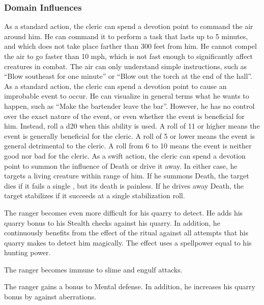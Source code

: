 \subsubsection{Domain Influences}\label{Domain Influences}
As a standard action, the cleric can spend a devotion point to command the air around him.
He can command it to perform a task that lasts up to 5 minutes, and which does not take place farther than 300 feet from him.
He cannot compel the air to go faster than 10 mph, which is not fast enough to significantly affect creatures in combat.
The air can only understand simple instructions, such as ``Blow southeast for one minute'' or ``Blow out the torch at the end of the hall''.
As a standard action, the cleric can spend a devotion point to cause an improbable event to occur.
He can visualize in general terms what he wants to happen, such as ``Make the bartender leave the bar''.
However, he has no control over the exact nature of the event, or even whether the event is beneficial for him.
Instead, roll a d20 when this ability is used.
A roll of 11 or higher means the event is generally beneficial for the cleric.
A roll of 5 or lower means the event is general detrimental to the cleric.
A roll from 6 to 10 means the event is neither good nor bad for the cleric.
As a swift action, the cleric can spend a devotion point to summon the influence of Death or drive it away.
In either case, he targets a living creature within \rngmed range of him.
If he summons Death, the target dies if it fails a single , but its death is painless.
If he drives away Death, the target stabilizes if it succeeds at a single stabilization roll.


        The ranger becomes even more difficult for his quarry to detect.
        He adds his quarry bonus to his Stealth checks against his quarry.
        In addition, he continuously benefits from the effect of the  ritual against all attempts that his quarry makes to detect him magically.
        The effect uses a spellpower equal to his hunting power.

        The ranger becomes immune to slime and engulf attacks.


        The ranger gains a  bonus to Mental defense.
        In addition, he increases his quarry bonus by  against aberrations.

